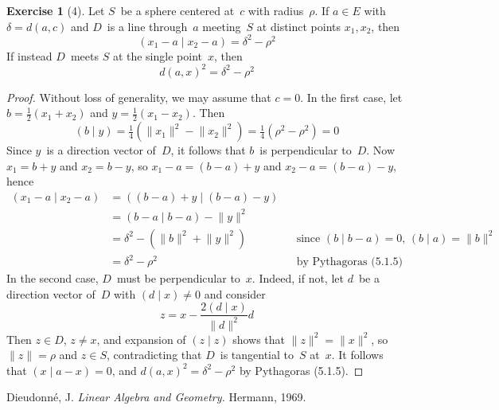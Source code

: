 \documentclass[letterpaper,12pt]{article}
\newcommand{\norm}[1]{\lVert{#1}\rVert}
\newcommand{\innerprod}[2]{({#1}\;|\;{#2})}
\theoremstyle{definition}
\newtheorem*{exer}{Exercise}
\theoremstyle{remark}
\begin{document}
\begin{exer}[4]
Let \(S\)~be a sphere centered at~\(c\) with radius~\(\rho\). If \(a\in E\) with \(\delta=d(a,c)\) and \(D\)~is a line through~\(a\) meeting~\(S\) at distinct points \(x_1,x_2\), then
\[\innerprod{x_1-a}{x_2-a}=\delta^2-\rho^2\]
If instead \(D\)~meets \(S\) at the single point~\(x\), then
\[d(a,x)^2=\delta^2-\rho^2\]
\end{exer}
\begin{proof}
Without loss of generality, we may assume that \(c=0\). In the first case, let \(b=\tfrac{1}{2}(x_1+x_2)\) and \(y=\tfrac{1}{2}(x_1-x_2)\). Then
\[\innerprod{b}{y}=\tfrac{1}{4}(\norm{x_1}^2-\norm{x_2}^2)=\tfrac{1}{4}(\rho^2-\rho^2)=0\]
Since \(y\)~is a direction vector of~\(D\), it follows that \(b\)~is perpendicular to~\(D\). Now \(x_1=b+y\) and \(x_2=b-y\), so \(x_1-a=(b-a)+y\) and \(x_2-a=(b-a)-y\), hence
\begin{align*}
\innerprod{x_1-a}{x_2-a}&=\innerprod{(b-a)+y}{(b-a)-y}&&\\
	&=\innerprod{b-a}{b-a}-\norm{y}^2&&\\
	&=\delta^2-(\norm{b}^2+\norm{y}^2)&&\text{since }\innerprod{b}{b-a}=0\text{, }\innerprod{b}{a}=\norm{b}^2\\
	&=\delta^2-\rho^2&&\text{by Pythagoras (5.1.5)}
\end{align*}
In the second case, \(D\)~must be perpendicular to~\(x\). Indeed, if not, let \(d\)~be a direction vector of~\(D\) with \(\innerprod{d}{x}\ne 0\) and consider
\[z=x-\frac{2\innerprod{d}{x}}{\norm{d}^2}d\]
Then \(z\in D\), \(z\ne x\), and expansion of \(\innerprod{z}{z}\) shows that \(\norm{z}^2=\norm{x}^2\), so \(\norm{z}=\rho\) and \(z\in S\), contradicting that \(D\)~is tangential to~\(S\) at~\(x\). It follows that \(\innerprod{x}{a-x}=0\), and \(d(a,x)^2=\delta^2-\rho^2\) by Pythagoras (5.1.5).
\end{proof}

\begin{thebibliography}{0}
 Dieudonn\'e, J. \textit{Linear Algebra and Geometry.} Hermann, 1969.
\end{thebibliography}
\end{document}
